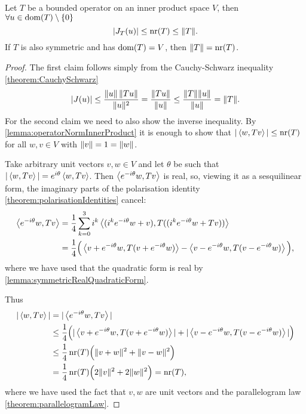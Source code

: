 \begin{proposition}
Let $T$ be a bounded operator on an inner product space $V$, then $\forall u\in \operatorname{dom}(T)\setminus\{0\}$
\[ |J_T(u)| \leq \operatorname{nr}(T) \leq \lVert T\rVert. \]
If $T$ is also symmetric and has $\operatorname{dom}(T)=V$, then $\lVert T\rVert = \operatorname{nr}(T)$.
\end{proposition}
\begin{proof}
The first claim follows simply from the Cauchy-Schwarz inequality \ref{theorem:CauchySchwarz}
\[ |J(u)| \leq \frac{\lVert u\rVert\,\lVert Tu\rVert}{\lVert u\rVert^2} = \frac{\lVert Tu\rVert}{\lVert u\rVert} \leq \frac{\lVert T\rVert\lVert u\rVert}{\lVert u\rVert} = \lVert T\rVert. \]
For the second claim we need to also show the inverse inequality. By \ref{lemma:operatorNormInnerProduct} it is enough to show that $|\left\langle w,Tv \right\rangle| \leq \operatorname{nr}(T)$ for all $w,v\in V$ with $\lVert v\rVert = 1 = \lVert w\rVert$.

Take arbitrary unit vectors $v,w\in V$ and let $\theta$ be such that $|\left\langle w,Tv \right\rangle| = e^{i\theta}\left\langle w,Tv \right\rangle$. Then $\left\langle e^{-i\theta}w,Tv \right\rangle$ is real, so, viewing it as a sesquilinear form, the imaginary parts of the polarisation identity \ref{theorem:polarisationIdentities} cancel:
\begin{align*}
\left\langle e^{-i\theta}w,Tv \right\rangle &= \frac{1}{4}\sum_{k=0}^3i^k \left\langle (i^ke^{-i\theta}w + v), T((i^ke^{-i\theta}w + Tv)) \right\rangle \\
&= \frac{1}{4}\Big( \left\langle v+e^{-i\theta}w, T(v+e^{-i\theta}w) \right\rangle - \left\langle v-e^{-i\theta}w, T(v-e^{-i\theta}w) \right\rangle \Big),
\end{align*}
where we have used that the quadratic form is real by \ref{lemma:symmetricRealQuadraticForm}.

Thus
\begin{align*}
|\left\langle w,Tv \right\rangle| &= |\left\langle e^{-i\theta}w,Tv \right\rangle| \\
&\leq \frac{1}{4}\Big( |\left\langle v+e^{-i\theta}w, T(v+e^{-i\theta}w) \right\rangle| + |\left\langle v-e^{-i\theta}w, T(v-e^{-i\theta}w) \right\rangle| \Big) \\
&\leq \frac{1}{4}\operatorname{nr}(T)\Big( \lVert v+w\rVert^2 + \lVert v-w\rVert^2 \Big) \\
&= \frac{1}{4}\operatorname{nr}(T)\Big( 2\lVert v\rVert^2 + 2\lVert w\rVert^2 \Big) = \operatorname{nr}(T),
\end{align*}
where we have used the fact that $v,w$ are unit vectors and the parallelogram law \ref{theorem:parallelogramLaw}.
\end{proof}